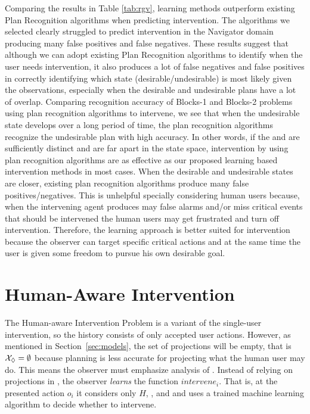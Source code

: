 Comparing the results in Table \ref{tab:rgv}, learning methods outperform existing Plan Recognition algorithms when predicting intervention. 
The algorithms we selected clearly struggled to predict intervention in the Navigator domain producing many false positives and false negatives.
These results suggest that although we can adopt existing Plan Recognition algorithms to identify when the user needs intervention, it also produces a lot of false negatives and false positives in correctly identifying which state (desirable/undesirable) is most likely given the observations, especially when the desirable and undesirable plans have a lot of overlap.
Comparing recognition accuracy of Blocks-1 and Blocks-2 problems using plan recognition algorithms to intervene, we see that when the undesirable state develops over a long period of time, the plan recognition algorithms recognize the undesirable plan with high accuracy. 
In other words, if the \desired and \undesired are sufficiently distinct and are far apart in the state space, intervention by using plan recognition algorithms are as effective as our proposed learning based intervention methods in most cases.
When the desirable and undesirable states are closer, existing plan recognition algorithms produce many false positives/negatives.
This is unhelpful specially considering human users because, when the intervening agent produces may false alarms and/or miss critical events that should be intervened the human users may get frustrated and turn off intervention.
Therefore, the learning approach is better suited for intervention because the observer can target specific critical actions  and at the same time the user is given some freedom to pursue his own desirable goal.

%
\section{Human-Aware Intervention}
\label{sec:human-aware}
The Human-aware Intervention Problem is a variant of the single-user intervention, so the history \historyDef consists of only accepted user actions.
However, as mentioned in Section~\ref{sec:models}, the set of projections will be empty, that is $\mathcal{X}_\Diamond = \emptyset$ because planning is less accurate for projecting what the human user may do.
This means the observer must emphasize analysis of \historyDef.
Instead of relying on projections in \Suffixes, the observer \emph{learns} the function $intervene_i$.
That is, at the presented action $o_i$ it considers only $H$, \desired, and \undesired and uses a trained machine learning algorithm to decide whether to intervene.

